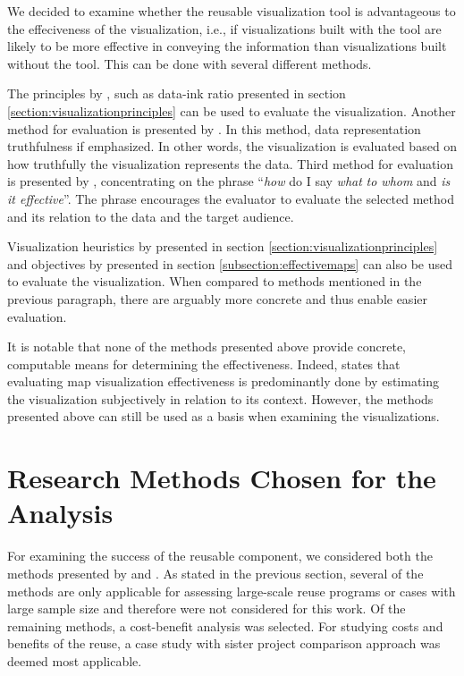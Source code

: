 We decided to examine whether the reusable visualization tool is advantageous to the effeciveness of the visualization, i.e., if visualizations built with the tool are likely to be more effective in conveying the information than visualizations built without the tool. This can be done with several different methods. 

The principles by \citet{tufte_visual_1986}, such as data-ink ratio presented in section \ref{section:visualizationprinciples} can be used to evaluate the visualization. Another method for evaluation is presented by \citet{azzam_j-b_2013}. In this method, data representation truthfulness if emphasized. In other words, the visualization is evaluated based on how truthfully the visualization represents the data. Third method for evaluation is presented by \citet{kraak_cartographic_1998}, concentrating on the phrase ``\emph{how} do I say \emph{what} \emph{to whom} and \emph{is it effective}''. The phrase encourages the evaluator to evaluate the selected method and its relation to the data and the target audience.

Visualization heuristics by \citet{zuk_heuristics_2006} presented in section \ref{section:visualizationprinciples} and objectives by \citet{schlichtmann_visualization_2002} presented in section \ref{subsection:effectivemaps} can also be used to evaluate the visualization. When compared to methods mentioned in the previous paragraph, there are arguably more concrete and thus enable easier evaluation.

It is notable that none of the methods presented above provide concrete, computable means for determining the effectiveness. Indeed, \citet{kraak_cartographic_1998} states that evaluating map visualization effectiveness is predominantly done by estimating the visualization subjectively in relation to its context. However, the methods presented above can still be used as a basis when examining the visualizations.

\section{Research Methods Chosen for the Analysis}

For examining the success of the reusable component, we considered both the methods presented by \citet{frakes_software_1996} and \citet{mohagheghi_quality_2007}. As stated in the previous section, several of the methods are only applicable for assessing large-scale reuse programs or cases with large sample size and therefore were not considered for this work. Of the remaining methods, a cost-benefit analysis was selected. For studying costs and benefits of the reuse, a case study with sister project comparison approach was deemed most applicable. 

